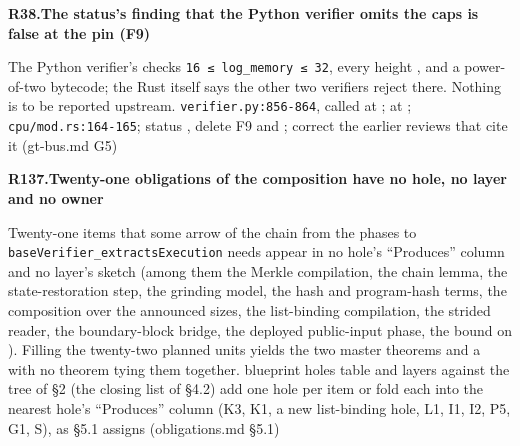 \par\medskip\noindent\textbf{R38.}\enspace\textbf{The status's finding that the Python verifier omits the caps is false at the pin (F9)}\par\nopagebreak
{} The Python verifier's  checks \texttt{16 ≤ log\_\allowbreak{}memory ≤ 32}, every height ,  and a power-of-two bytecode; the Rust itself says the other two verifiers reject there. Nothing is to be reported upstream.
 \texttt{verifier.\allowbreak{}py:\allowbreak{}856-\allowbreak{}864}, called at ;  at ; \texttt{cpu/\allowbreak{}mod.\allowbreak{}rs:\allowbreak{}164-\allowbreak{}165}; status , 
 delete F9 and ; correct the earlier reviews that cite it (gt-bus.md G5)

\par\medskip\noindent\textbf{R137.}\enspace\textbf{Twenty-one obligations of the composition have no hole, no layer and no owner}\par\nopagebreak
{} Twenty-one items that some arrow of the chain from the phases to \texttt{base\allowbreak{}Verifier\_\allowbreak{}extracts\allowbreak{}Execution} needs appear in no hole's ``Produces'' column and no layer's sketch (among them the Merkle compilation, the chain lemma, the state-restoration step, the grinding model, the hash and program-hash terms, the composition over the announced sizes, the list-binding compilation, the strided reader, the boundary-block bridge, the deployed public-input phase, the bound on ). Filling the twenty-two planned units yields the two master theorems and a  with no theorem tying them together.
 blueprint holes table  and layers  against the tree of §2 (the closing list of §4.2)
 add one hole per item or fold each into the nearest hole's ``Produces'' column (K3, K1, a new list-binding hole, L1, I1, I2, P5, G1, S), as §5.1 assigns (obligations.md §5.1)

